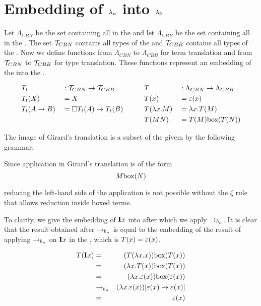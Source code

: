 \section{\texorpdfstring{Embedding of \boldmath${\lambda_n}$ into \boldmath${\lambda_b}$}{Embedding of call-by-name lambda calculus into the call-by-box lambda calculus}}


Let $\Lambda_{CBN}$ be the set containing all \lterms in the \lan
and let $\Lambda_{CBB}$ be the set containing all \lterms in the \lab. 
The set $\mathcal{T}_{CBN}$ contains all types of the \lan and $\mathcal{T}_{CBB}$ contains all types of the \lab. 
Now we define functions from $\Lambda_{CBN}$ to $\Lambda_{CBB}$ for term translation and from $\mathcal{T}_{CBN}$ to $\mathcal{T}_{CBB}$ for type translation. 
These functions represent an embedding of the \lan into the \lab. 

\[
\begin{aligned}
  & T_t          & & : \mathcal{T}_{CBN} \to \mathcal{T}_{CBB}           & & \quad & & T              & &: \Lambda_{CBN} \to \Lambda_{CBB} \\
  & T_t(X)       & & = X                               & & \quad & & T(x)           & &= \varepsilon(x) \\
  & T_t(A \to B) & & = \square{T_t(A)} \to T_t(B)  & & \quad & & T(\lambda {x}.{M}) & &= \lambda {x}.{T(M)} \\
  &                 & &                                   & & \quad & & T(M N)         & &= T(M) \text{box}({T(N)})
\end{aligned}
\]

The image of Girard's translation is a subset of the \lab givem by the following grammar:

\vspace{10pt}
\begin{grammar}{
	}
\end{grammar}
\vspace{10pt}

Since application in Girard's translation is of the form 
\[
M \text{box}({N})
\]

reducing the left-hand side of the application is not possible without the $\zeta$ rule that allows reduction inside boxed terms.

To clarify, we give the embedding of $\mathbf{I} x$ into \lab after which we apply $\to_{b_n}$. 
It is clear that the result obtained after $\to_{b_n}$ is equal to the embedding of the result of applying $\to_{b_n}$ on $\mathbf{I} x$ in the \lan, which is $T(x) = \varepsilon(x)$.  

\begin{eqnarray*}
  T(\mathbf{I} x) &=& (T(\lambda {x}.{x})) \text{box}({T(x)}) \\
  &=& (\lambda {x}.{T(x)}) \text{box}({T(x)}) \\
  &=& (\lambda {x}.{\varepsilon(x)}) \text{box}({\varepsilon(x)}) \\
  &\to_{b_n}& (\lambda {x}.{\varepsilon(x)}) [{\varepsilon(x)}\mapsto{\varepsilon(x)}] \\
  &=& \varepsilon(x)
\end{eqnarray*}

